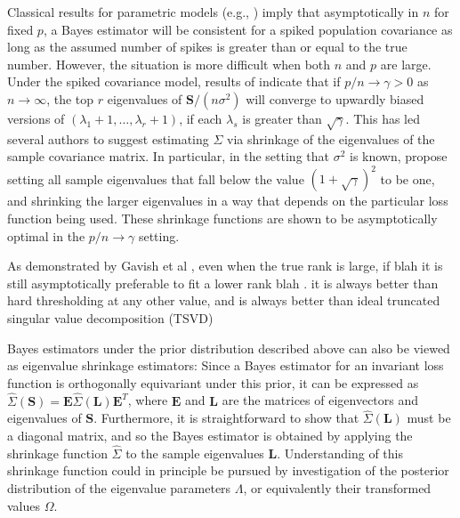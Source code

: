 \documentclass{article}
\newcommand{\bl}[1]{{\mathbf #1}}
\begin{document}
Classical results for parametric models 
(e.g., \citet{schwartz_1965})  
imply that 
asymptotically in $n$ for fixed $p$, a Bayes estimator
will be consistent for a spiked  population covariance 
as long as the assumed number of spikes is greater than or equal to 
the true number. 
However, the situation is more difficult 
when both $n$ and $p$ are large.  
Under the spiked covariance model, 
results of 
\citet{Baik2006, Paul2007} indicate that if 
$p/n \rightarrow \gamma >0$ as $n\rightarrow \infty$,   
the top $r$ eigenvalues of $\bl S/(n\sigma^2)$ will converge 
to upwardly  biased versions of $(\lambda_1+1,\ldots, \lambda_r+1)$, 
if each $\lambda_s $ is greater than $\sqrt{\gamma}$.   
This has led several authors to suggest estimating 
$\Sigma$ via shrinkage of the eigenvalues of the sample covariance 
matrix. In particular, 
in the setting that $\sigma^2$ is known, 
\citet{Donoho2013} propose  
setting all sample eigenvalues that fall below 
the value $(1+\sqrt{\gamma})^2$ to be one, and shrinking the larger 
eigenvalues in a way that depends on the particular 
loss function being used. 
These shrinkage functions are shown to be asymptotically 
optimal in the $p/n\rightarrow \gamma$ setting. 

As demonstrated by Gavish et al \citep{Gavish2014}, even when the
true rank is large, if blah it is still asymptotically preferable to fit a lower rank
blah .  it is always better than hard thresholding at any other value, and is always better than ideal truncated singular value decomposition (TSVD)

Bayes estimators under the prior distribution described above 
can also be viewed as eigenvalue shrinkage estimators: 
Since a Bayes estimator for an invariant loss function 
is orthogonally equivariant under this prior, 
it can be expressed as 
$\hat \Sigma(\bl S) = \bl E  \hat \Sigma (\bl L) \bl E^T$, 
where $\bl E$ and $\bl L$ are the matrices of eigenvectors and 
eigenvalues of $\bl S$. Furthermore, it is straightforward to 
show that $\hat \Sigma (\bl L)$ must be a diagonal matrix, 
and so the Bayes estimator is obtained by applying the 
shrinkage function $\hat\Sigma$ to the sample eigenvalues $\bl L$. 
Understanding of this shrinkage function could in principle 
be pursued by investigation of the posterior distribution of the 
eigenvalue parameters $\Lambda$, or equivalently their  
transformed values $\Omega$.   
\end{document}
